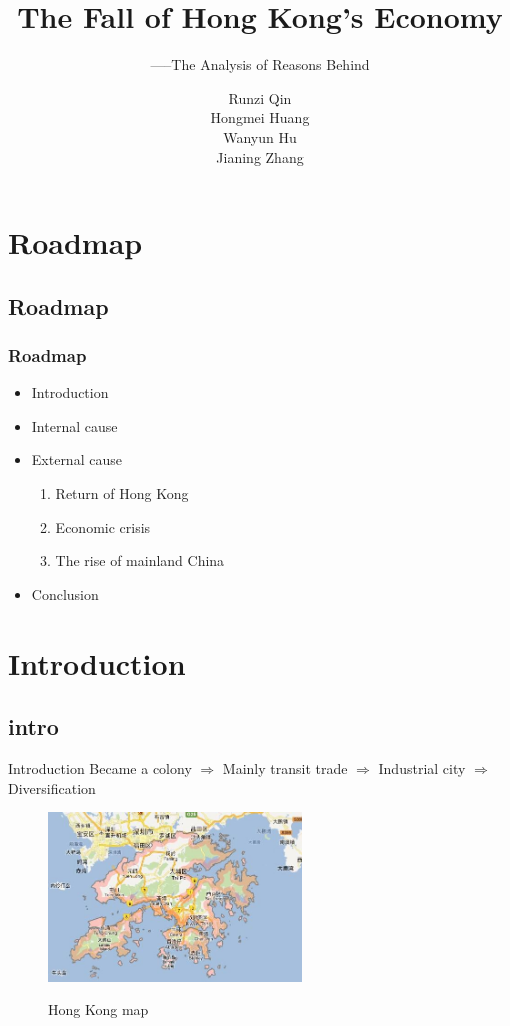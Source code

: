 \documentclass[slidestop,uncompress,mathsans, 12pt]{beamer}
\begin{document}
\begin{frame}
\title{The Fall of Hong Kong's Economy}
\subtitle{-----The Analysis of Reasons Behind}
\author{Runzi Qin\\   Hongmei Huang\\   Wanyun Hu\\ Jianing Zhang}
\titlepage
\end{frame}

\section{Roadmap}
\subsection{Roadmap}
\begin{frame}
\frametitle{Roadmap}
\begin{itemize}
\item Introduction
\item Internal cause
\item External cause
\begin{enumerate}
\item  Return of Hong Kong
\item  Economic crisis
\item  The rise of mainland China
\end{enumerate}

\item  Conclusion
\end{itemize}
\end{frame}
\section{Introduction}
\subsection{intro}
\begin{frame}{Introduction}
Became a colony $\Longrightarrow$
 Mainly transit trade $\Longrightarrow$
 Industrial city $\Longrightarrow$
 Diversification\\
\bigskip
\begin{figure}[h]
\centering
\includegraphics[width=0.6\textwidth]{hk16.jpg}
\label{threadsVsSync}
\caption{Hong Kong map}
\end{figure}
\end{frame}
\end{document}
